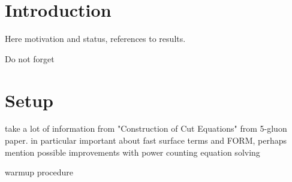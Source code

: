 \section{Introduction}
Here motivation and status, references to results.

Do not forget 

\section{Setup}

take a lot of information from "Construction of Cut Equations" from 5-gluon paper.
in particular important about fast surface terms and FORM,
perhaps mention possible improvements with power counting equation solving

warmup procedure

